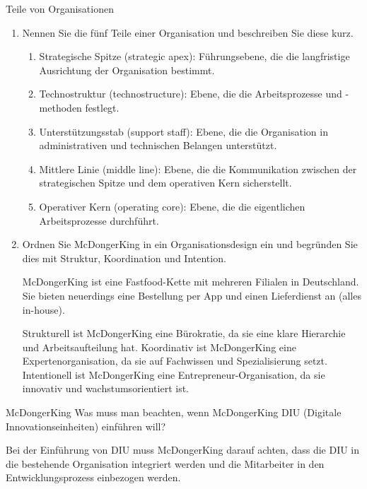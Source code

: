 \documentclass{article}
\begin{document}
\begin{exercise}{Teile von Organisationen}
  \begin{enumerate}
    \item Nennen Sie die fünf Teile einer Organisation und beschreiben Sie diese kurz.
          \begin{solution}
            \begin{enumerate}
              \item Strategische Spitze (strategic apex): Führungsebene, die die langfristige Ausrichtung der Organisation bestimmt.
              \item Technostruktur (technostructure): Ebene, die die Arbeitsprozesse und -methoden festlegt.
              \item Unterstützungsstab (support staff): Ebene, die die Organisation in administrativen und technischen Belangen unterstützt.
              \item Mittlere Linie (middle line): Ebene, die die Kommunikation zwischen der strategischen Spitze und dem operativen Kern sicherstellt.
              \item Operativer Kern (operating core): Ebene, die die eigentlichen Arbeitsprozesse durchführt.
            \end{enumerate}
          \end{solution}
    \item Ordnen Sie McDongerKing in ein Organisationsdesign ein und begründen Sie dies mit Struktur, Koordination und Intention.
          \begin{solution}
            McDongerKing ist eine Fastfood-Kette mit mehreren Filialen in Deutschland. Sie bieten neuerdings eine Bestellung per App und einen Lieferdienst an (alles in-house).

            Strukturell ist McDongerKing eine Bürokratie, da sie eine klare Hierarchie und Arbeitsaufteilung hat. Koordinativ ist McDongerKing eine Expertenorganisation, da sie auf Fachwissen und Spezialisierung setzt. Intentionell ist McDongerKing eine Entrepreneur-Organisation, da sie innovativ und wachstumsorientiert ist.
          \end{solution}
  \end{enumerate}
\end{exercise}

\begin{exercise}{McDongerKing}
  Was muss man beachten, wenn McDongerKing DIU (Digitale Innovationseinheiten) einführen will?

  \begin{solution}
    Bei der Einführung von DIU muss McDongerKing darauf achten, dass die DIU in die bestehende Organisation integriert werden und die Mitarbeiter in den Entwicklungsprozess einbezogen werden.
  \end{solution}
\end{exercise}
\end{document}
